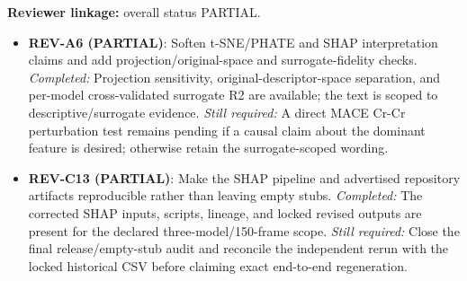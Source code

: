 \textbf{Reviewer linkage:} overall status PARTIAL.
\begin{itemize}[leftmargin=1.4em,noitemsep]
\item \textbf{REV-A6 (PARTIAL)}: Soften t-SNE/PHATE and SHAP interpretation claims and add projection/original-space and surrogate-fidelity checks. \emph{Completed:} Projection sensitivity, original-descriptor-space separation, and per-model cross-validated surrogate R2 are available; the text is scoped to descriptive/surrogate evidence. \emph{Still required:} A direct MACE Cr-Cr perturbation test remains pending if a causal claim about the dominant feature is desired; otherwise retain the surrogate-scoped wording.
\item \textbf{REV-C13 (PARTIAL)}: Make the SHAP pipeline and advertised repository artifacts reproducible rather than leaving empty stubs. \emph{Completed:} The corrected SHAP inputs, scripts, lineage, and locked revised outputs are present for the declared three-model/150-frame scope. \emph{Still required:} Close the final release/empty-stub audit and reconcile the independent rerun with the locked historical CSV before claiming exact end-to-end regeneration.
\end{itemize}
